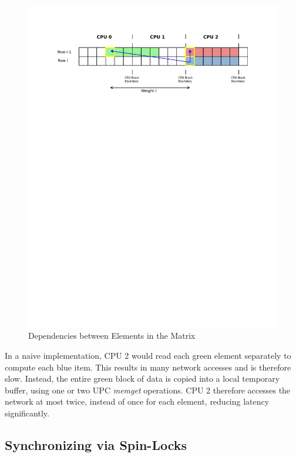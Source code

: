 \documentclass[11pt]{article} %
\begin{document}
\begin{figure}
\begin{centering}
\includegraphics*[width=0.5\paperwidth, viewport= 70 575 540 720]{figures/memcpy_diagram.pdf}
\caption{Dependencies between Elements in the Matrix}
\label{memcpy_diagram}
\end{centering}
\end{figure}

In a naive implementation, CPU 2 would read each green element separately to compute each blue item. This results in many network accesses and is therefore slow. Instead, the entire green block of data is copied into a local temporary buffer, using one or two UPC \emph{memget} operations. CPU 2 therefore accesses the network at most twice, instead of once for each element, reducing latency significantly.

\subsection{Synchronizing via Spin-Locks}
\end{document}
